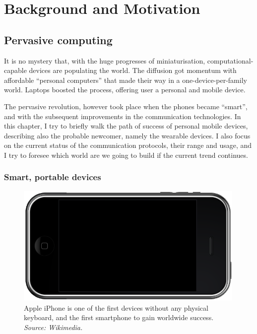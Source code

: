 \documentclass[12pt,a4paper,twoside,openright]{book}
\begin{document}
\mainmatter

\pagestyle{fancy}
\fancyhead[LE,RO]{\bfseries\thepage}

\part{Background and Motivation}
\label{background}
\chapter{Pervasive computing}
\label{pervasive-devices}

It is no mystery that, with the huge progresses of miniaturisation, computational-capable devices are populating the world.
%
The diffusion got momentum with affordable ``personal computers'' that made their way in a one-device-per-family world.
%
Laptops boosted the process, offering user a personal and mobile device.

The pervasive revolution, however took place when the phones became ``smart'', and with the subsequent improvements in the communication technologies.
%
In this chapter, I try to briefly walk the path of success of personal mobile devices, describing also the probable newcomer, namely the wearable devices.
%
I also focus on the current status of the communication protocols, their range and usage, and I try to foresee which world are we going to build if the current trend continues.

\section{Smart, portable devices}

\begin{figure}
	\centering
	\includegraphics[width=0.99\textwidth]{img/iphone}
	\caption{Apple iPhone is one of the first devices without any physical keyboard, and the first smartphone to gain worldwide success. \emph{Source: Wikimedia.}}
	\label{img:iphone}
\end{figure}
\end{document}
